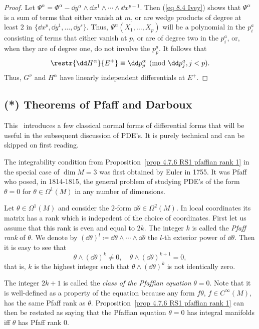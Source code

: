 \begin{proof}
    Let $\Psi^\alpha=\Phi^\alpha-\dd y^\alpha\wedge\dd x^1\wedge\cdots\wedge\dd x^{p-1}$. Then (\ref{eq 8.4 Ivey}) shows that $\Psi^\alpha$ is a sum of terms that either vanish at $m$, or are wedge products of degree at least $2$ in $\{\dd x^p,\dd y^1,\ldots,\dd y^s\}$. Thus, $\Psi^\alpha(X_1,\ldots,X_p)$ will be a polynomial in the $p^a_i$ consisting of terms that either vanish at $p$, or are of degree two in the $p^a_i$, or, when they are of degree one, do not involve the $p^a_p$. It follows that 
    \[\restr{\dd H^\alpha}{E^+}\equiv \dd p^\alpha_p \pmod{\dd p^a_j,j<p}.\]
    Thus, $G^\nu$ and $H^\alpha$ have linearly independent differentials at $E^+$.
\end{proof}











\subsection{(*) Theorems of Pfaff and Darboux}

This \subsect\ introduces a few classical normal forms of differential forms that will be useful in the subsequent discussion of PDE's. It is purely technical and can be skipped on first reading.

The integrability condition from Proposition~\ref{prop 4.7.6 RS1 pfaffian rank 1} in the special case of $\dim M=3$ was first obtained by Euler in 1755. It was Pfaff who posed, in 1814-1815, the general problem of studying PDE's of the form $\theta=0$ for $\theta\in\Omega^1(M)$ in any number of dimensions.

Let $\theta\in\Omega^1(M)$ and consider the $2$-form $\dd\theta\in\Omega^2(M)$. In local coordinates its matrix has a rank which is indepedent of the choice of coordinates. First let us assume that this rank is even and equal to $2k$. The integer $k$ is called the \emph{Pfaff rank} of $\theta$. We denote by $(\dd\theta)^l\coloneqq \dd\theta\wedge\cdots\wedge\dd\theta$ the $l$-th exterior power of $\dd\theta$. Then it is easy to see that 
\[\theta\wedge(\dd\theta)^{k}\neq 0,\quad \theta\wedge(\dd\theta)^{k+1}=0,\]
that is, $k$ is the highest integer such that $\theta\wedge(\dd\theta)^{k}$ is not identically zero. 

The integer $2k+1$ is called the \emph{class of the Pfaffian equation} $\theta=0$. Note that it is well-defined as a property of the equation because any form $f\theta$, $f\in C^\infty(M)$, has the same Pfaff rank as $\theta$. Proposition~\ref{prop 4.7.6 RS1 pfaffian rank 1} can then be restated as saying that the Pfaffian equation $\theta=0$ has integral manifolds iff $\theta$ has Pfaff rank $0$.

